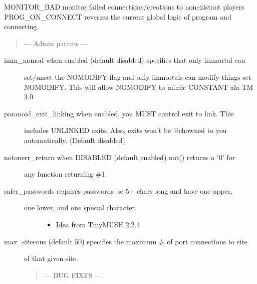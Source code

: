 \documentclass[letterpaper,10pt,english]{sphinxmanual}
\begin{document}
\sphinxAtStartPar
MONITOR\_BAD \sphinxhyphen{} monitor failed connections/creations to non\sphinxhyphen{}existant players
PROG\_ON\_CONNECT \sphinxhyphen{} reverses the current global logic of program and connecting.
\begin{quote}

\sphinxAtStartPar
— Admin params —
\end{quote}
\begin{description}
\item[{imm\_nomod \sphinxhyphen{} when enabled (default disabled) specifies that only immortal can}] \leavevmode
\sphinxAtStartPar
set/unset the NOMODIFY flag and only immortals can modify things
set NOMODIFY.  This will allow NOMODIFY to mimic CONSTANT ala TM 3.0

\item[{paranoid\_exit\_linking \sphinxhyphen{} when enabled, you MUST control exit to link.  This}] \leavevmode
\sphinxAtStartPar
includes UNLINKED exits.  Also, exits won’t be @chowned to you
automatically. (Default disabled)

\item[{notonerr\_return \sphinxhyphen{} when DISABLED (default enabled) not() returns a ‘0’ for}] \leavevmode
\sphinxAtStartPar
any function returning \#\sphinxhyphen{}1.

\item[{safer\_passwords \sphinxhyphen{} requires passwords be 5+ chars long and have one upper,}] \leavevmode\begin{description}
\item[{one lower, and one special character.}] \leavevmode\begin{itemize}
\item {} 
\sphinxAtStartPar
Idea from TinyMUSH 2.2.4

\end{itemize}

\end{description}

\item[{max\_sitecons \sphinxhyphen{} (default 50) specifies the maximum \# of port connections to site}] \leavevmode
\sphinxAtStartPar
of that given site.
\begin{quote}

\sphinxAtStartPar
— BUG FIXES —
\end{quote}

\end{description}
\end{document}
